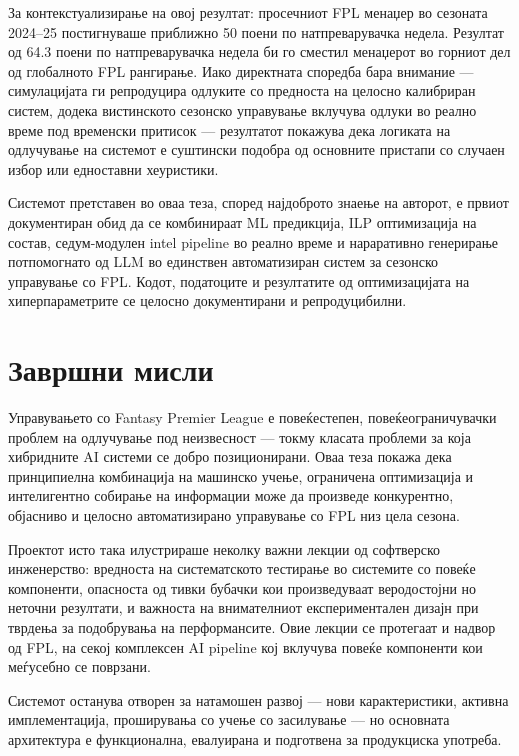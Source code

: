 За контекстуализирање на овој резултат: просечниот FPL менаџер во сезоната 2024--25 постигнуваше приближно 50 поени по натпреварувачка недела. Резултат од 64.3 поени по натпреварувачка недела би го сместил менаџерот во горниот дел од глобалното FPL рангирање. Иако директната споредба бара внимание — симулацијата ги репродуцира одлуките со предноста на целосно калибриран систем, додека вистинското сезонско управување вклучува одлуки во реално време под временски притисок — резултатот покажува дека логиката на одлучување на системот е суштински подобра од основните пристапи со случаен избор или едноставни хеуристики.

Системот претставен во оваа теза, според најдоброто знаење на авторот, е првиот документиран обид да се комбинираат ML предикција, ILP оптимизација на состав, седум-модулен intel pipeline во реално време и нараративно генерирање потпомогнато од LLM во единствен автоматизиран систем за сезонско управување со FPL. Кодот, податоците и резултатите од оптимизацијата на хиперпараметрите се целосно документирани и репродуцибилни.

\section{Завршни мисли}

Управувањето со Fantasy Premier League е повеќестепен, повеќеограничувачки проблем на одлучување под неизвесност — токму класата проблеми за која хибридните AI системи се добро позиционирани. Оваа теза покажа дека принципиелна комбинација на машинско учење, ограничена оптимизација и интелигентно собирање на информации може да произведе конкурентно, објасниво и целосно автоматизирано управување со FPL низ цела сезона.

Проектот исто така илустрираше неколку важни лекции од софтверско инженерство: вредноста на систематското тестирање во системите со повеќе компоненти, опасноста од тивки бубачки кои произведуваат веродостојни но неточни резултати, и важноста на внимателниот експериментален дизајн при тврдења за подобрувања на перформансите. Овие лекции се протегаат и надвор од FPL, на секој комплексен AI pipeline кој вклучува повеќе компоненти кои меѓусебно се поврзани.

Системот останува отворен за натамошен развој — нови карактеристики, активна имплементација, проширувања со учење со засилување — но основната архитектура е функционална, евалуирана и подготвена за продукциска употреба.
